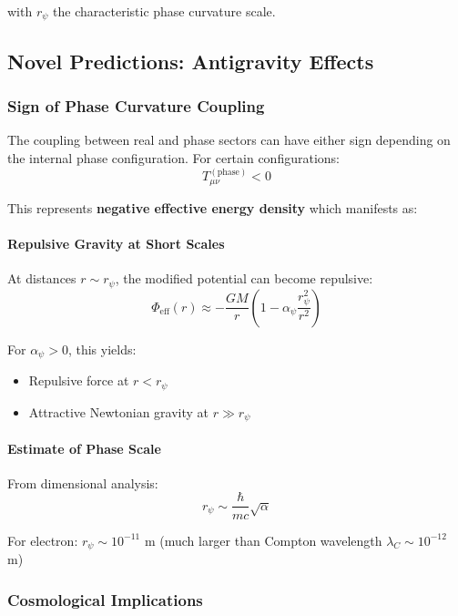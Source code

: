 \documentclass[12pt]{article}
\begin{document}
with $r_\psi$ the characteristic phase curvature scale.

\subsection{Novel Predictions: Antigravity Effects}

\subsubsection{Sign of Phase Curvature Coupling}

The coupling between real and phase sectors can have either sign depending on the internal phase configuration. For certain configurations:
\begin{equation}
    T_{\mu\nu}^{(\text{phase})} < 0
\end{equation}

This represents \textbf{negative effective energy density} which manifests as:

\paragraph{Repulsive Gravity at Short Scales}

At distances $r \sim r_\psi$, the modified potential can become repulsive:
\begin{equation}
    \Phi_{\text{eff}}(r) \approx -\frac{GM}{r}\left(1 - \alpha_\psi \frac{r_\psi^2}{r^2}\right)
\end{equation}

For $\alpha_\psi > 0$, this yields:
\begin{itemize}
    \item Repulsive force at $r < r_\psi$
    \item Attractive Newtonian gravity at $r \gg r_\psi$
\end{itemize}

\paragraph{Estimate of Phase Scale}

From dimensional analysis:
\begin{equation}
    r_\psi \sim \frac{\hbar}{mc} \sqrt{\alpha}
\end{equation}

For electron: $r_\psi \sim 10^{-11}$ m (much larger than Compton wavelength $\lambda_C \sim 10^{-12}$ m)

\subsubsection{Cosmological Implications}
\end{document}
